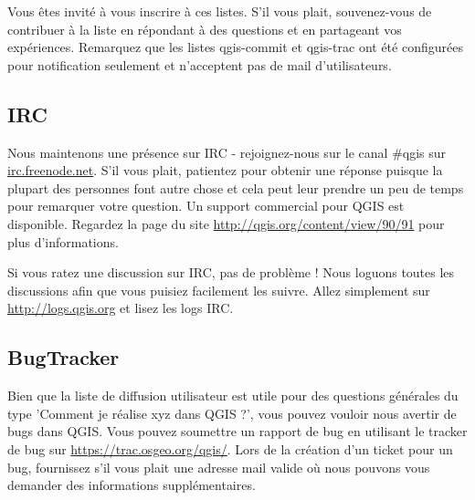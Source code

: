 Vous \^etes invit\'e \`a vous inscrire \`a ces listes. S'il vous plait, souvenez-vous de
contribuer \`a la liste en r\'epondant \`a des questions et en partageant vos
exp\'eriences. Remarquez que les listes qgis-commit et qgis-trac ont \'et\'e
configur\'ees pour notification seulement et n'acceptent pas de mail
d'utilisateurs.

\subsection{IRC}
Nous maintenons une pr\'esence sur IRC - rejoignez-nous sur le canal \#qgis sur
\url{irc.freenode.net}. S'il vous plait, patientez pour obtenir une r\'eponse
puisque la plupart des personnes font autre chose et cela peut leur prendre un
peu de temps pour remarquer votre question. Un support commercial pour QGIS est
disponible. Regardez la page du site \url{http://qgis.org/content/view/90/91}
pour plus d'informations.

Si vous ratez une discussion sur IRC, pas de probl\`eme ! Nous loguons toutes les
discussions afin que vous puisiez facilement les suivre. Allez simplement sur
\url{http://logs.qgis.org} et lisez les logs IRC.

\subsection{BugTracker}
Bien que la liste de diffusion utilisateur est utile pour des questions
g\'en\'erales du type 'Comment je r\'ealise xyz dans QGIS ?', vous pouvez vouloir
nous avertir de bugs dans QGIS. Vous pouvez soumettre un rapport de bug en
utilisant le tracker de bug sur \url{https://trac.osgeo.org/qgis/}. Lors de la
cr\'eation d'un ticket pour un bug, fournissez s'il vous plait une adresse mail
valide o\`u nous pouvons vous demander des informations suppl\'ementaires.

